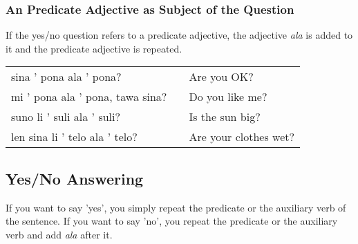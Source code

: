 \subsubsection*{An Predicate Adjective as Subject of the Question}
If the yes/no question refers to a predicate adjective, the adjective \textit{ala} is added to it and the predicate adjective is repeated.

\begin{supertabular}{p{5,5cm}|ll}
    sina ' pona ala ' pona?          &  & Are you OK?           \\
    mi ' pona ala ' pona, tawa sina? &  & Do you like me?       \\
    suno li ' suli ala ' suli?       &  & Is the sun big?       \\
    len sina li ' telo ala ' telo?   &  & Are your clothes wet? \\
\end{supertabular}

\newpage
\subsection*{Yes/No Answering}
If you want to say 'yes', you simply repeat the predicate or the auxiliary verb of the sentence.
If you want to say 'no', you repeat the predicate or the auxiliary verb and add \textit{ala} after it.

